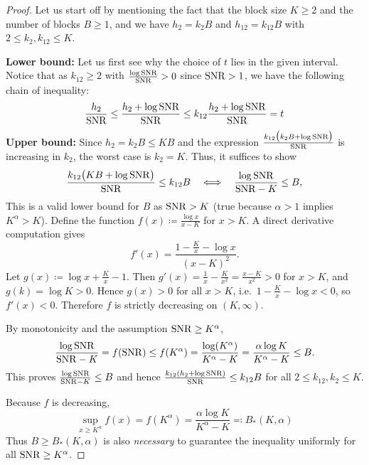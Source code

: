 \documentclass[numsec,webpdf,modern,medium,namedate]{oup-authoring-template}
\theoremstyle{thmstyleone}%
\theoremstyle{thmstyletwo}%
\theoremstyle{thmstylethree}%
\begin{document}
\begin{proof}
    Let us start off by mentioning the fact that the block size $K \geq 2$ and the number of blocks $B \geq 1$, and we have $h_2 = k_2B$ and $h_{12} = k_{12}B$ with $2 \leq k_2,k_{12}\leq K$.

    \textbf{Lower bound:} Let us first see why the choice of $t$ lies in the given interval. Notice that as $k_{12}\geq 2$ with $\frac{\log \mathrm{SNR}}{\mathrm{SNR}} > 0$ since $\mathrm{SNR} > 1$, we have the following chain of inequality:
    \begin{eqnarray*}
        \dfrac{h_2}{\mathrm{SNR}} \leq \dfrac{h_2 + \log \mathrm{SNR}}{\mathrm{SNR}} \leq k_{12}\dfrac{h_2 + \log \mathrm{SNR}}{\mathrm{SNR}}=t
    \end{eqnarray*}
\textbf{Upper bound:} Since $h_2=k_2B\le KB$ and the expression $\frac{k_{12}\big(k_2B+\log\mathrm{SNR}\big)}{\mathrm{SNR}}$ is increasing in $k_2$, the worst case is $k_2=K$. Thus, it suffices to show
$$
\frac{k_{12}\big(KB+\log\mathrm{SNR}\big)}{\mathrm{SNR}}\leq k_{12}B
\quad\Longleftrightarrow\quad
\frac{\log\mathrm{SNR}}{\mathrm{SNR}-K}\leq B,
$$
This is a valid lower bound for $B$ as  $\mathrm{SNR}>K$ (true because $\alpha>1$ implies $K^{\alpha}>K$). Define the function 
$f(x)\coloneqq\frac{\log x}{x-K}$ for $x>K$.
A direct derivative computation gives
$$
f'(x)=\frac{1-\tfrac{K}{x}-\log x}{(x-K)^2}.
$$
Let $g(x)\coloneq\log x+\tfrac{K}{x}-1$. Then $g'(x)=\tfrac{1}{x}-\tfrac{K}{x^2}=\tfrac{x-K}{x^2}>0$ for $x>K$, and 
$g(k)=\log K>0$. Hence $g(x)>0$ for all $x>K$, i.e.\ $1-\tfrac{K}{x}-\log x<0$, so $f'(x)<0$. 
Therefore $f$ is strictly decreasing on $(K,\infty)$.

By monotonicity and the assumption $\mathrm{SNR}\geq K^{\alpha}$,
$$
\frac{\log\mathrm{SNR}}{\mathrm{SNR}-K}=f(\mathrm{SNR})\le f(K^{\alpha})
=\frac{\log(K^{\alpha})}{K^{\alpha}-K}
=\frac{\alpha\log K}{K^{\alpha}-K}
\leq B.
$$
This proves $\frac{\log\mathrm{SNR}}{\mathrm{SNR}-K}\leq B$ and hence 
$\frac{k_{12}(h_2+\log\mathrm{SNR})}{\mathrm{SNR}}\leq k_{12}B$ for all $2\leq k_{12},k_2\leq K$.

Because $f$ is decreasing, 
$$
\sup_{x\ge K^{\alpha}} f(x) = f(K^{\alpha})=\frac{\alpha\log K}{K^{\alpha}-K}\eqqcolon B_\ast(K,\alpha)
$$
Thus $B\geq B_\ast(K,\alpha)$ is also \emph{necessary} to guarantee the inequality uniformly for all $\mathrm{SNR}\geq K^{\alpha}$.


\end{proof}
\end{document}
